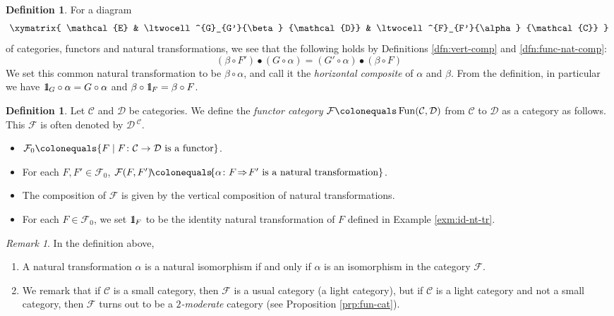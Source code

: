 \documentclass{surv-l}
\numberwithin{equation}{chapter}
\numberwithin{figure}{chapter}
\theoremstyle{plain}
\theoremstyle{definition}
\newtheorem{dfn}[thm]{Definition}
\theoremstyle{remark}
\newtheorem{rmk}[thm]{Remark}
\newcommand{\id}{1\kern-.25em{\text{{\rm l}}}}
\DeclareMathOperator{\Fun}{Fun}
\begin{document}
\begin{dfn}\label{dfn:horiz-comp}
For a diagram
\[
\xymatrix{
\mathcal{E} & \ltwocell^{G}_{G'}{\beta} {\mathcal{D}} & \ltwocell^{F}_{F'}{\alpha} {\mathcal{C}}
}
\]
of categories, functors and natural transformations, we see that the following holds
by Definitions \ref{dfn:vert-comp} and \ref{dfn:func-nat-comp}:
\[
(\beta\circ F') \bullet (G\circ \alpha) = (G' \circ \alpha) \bullet (\beta \circ F)
\]
We set this common natural transformation to be $\beta \circ \alpha$, and call it
the \emph{horizontal composite} of $\alpha$ and $\beta$.
From the definition, in particular we have
$\id_G \circ \alpha = G\circ \alpha$ and $\beta \circ \id_F = \beta \circ F$.
\end{dfn}

\begin{dfn}\label{dfn:fun-cat-gen}
Let ${\mathcal{C}}$ and ${\mathcal{D}}$ be categories.
We define the \emph{functor category} $\mathcal{F}\colonequals \Fun({\mathcal{C}}, {\mathcal{D}})$
from ${\mathcal{C}}$ to ${\mathcal{D}}$ as a category as follows.
This $\mathcal{F}$ is often denoted by ${\mathcal{D}}\,^{{\mathcal{C}}}$.
\begin{itemize}
\item
$\mathcal{F}_0\colonequals \{F \mid F\colon {\mathcal{C}} \to {\mathcal{D}} \text{ is a functor}\}$.
\item
For each $F, F' \!\in\! \mathcal{F}_0$,
$\mathcal{F}(F, F')\!\colonequals\!  \{ \alpha \colon F \!\Rightarrow\! F' \text{ is a natural transformation}\}$.
\item
The composition of $\mathcal{F}$ is given by the vertical composition of natural transformations.
\item
For each $F \in \mathcal{F}_0$, we set $\id_F$ to be the identity natural transformation of $F$
defined in Example \ref{exm:id-nt-tr}.
\end{itemize}
\end{dfn}

\begin{rmk}
\label{rmk:nat-iso-2-modrt}
In the definition above,
\begin{enumerate}
\item A natural transformation $\alpha$ is a natural isomorphism if and only if
$\alpha$ is an isomorphism in the category $\mathcal{F}$.

\item We remark that if ${\mathcal{C}}$ is a small category, then
$\mathcal{F}$ is a usual category (a light category), but
if ${\mathcal{C}}$ is a light category and not a small category, then
$\mathcal{F}$ turns out to be a \emph{$2$-moderate} category (see Proposition \ref{prp:fun-cat}).
\end{enumerate}
\end{rmk}
\end{document}
